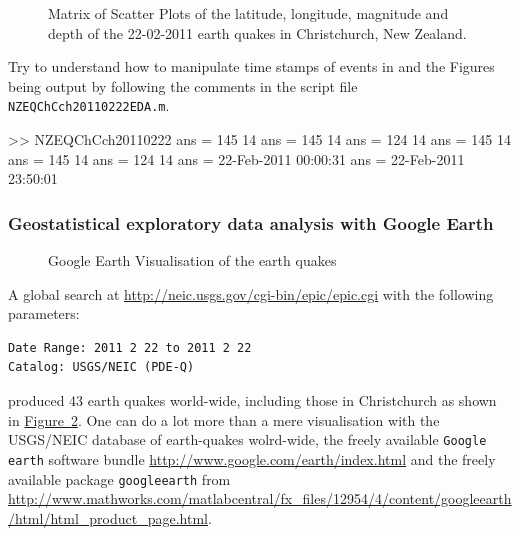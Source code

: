 \begin{figure}[htpb]
\caption{Matrix of Scatter Plots of the latitude, longitude, magnitude and depth of the 22-02-2011 earth quakes in Christchurch, New Zealand.\label{F:NZEQ20110222ChchLtLnMgDpScatterMatrixPlot}}
\centering   {}
\end{figure}


\begin{labwork}\label{LW:NZEQChCch20110222EDA}
Try to understand how to manipulate time stamps of events in \Matlab and the Figures being output by following the comments in the script file {\tt NZEQChCch20110222EDA.m}.
\begin{VrbM}
>> NZEQChCch20110222
ans =   145    14
ans =   145    14
ans =   124    14
ans =   145    14
ans =   145    14
ans =   124    14
ans = 22-Feb-2011 00:00:31
ans = 22-Feb-2011 23:50:01
\end{VrbM}
\end{labwork}

\subsubsection{Geostatistical exploratory data analysis with Google Earth}

\begin{figure}[htpb]
\caption{Google Earth Visualisation of the earth quakes\label{F:NZEQ20110222ChchLtLnMgDpInGoogleEarthViewFromUSGS}}
\centering   {}
\end{figure}

A global search at \href{http://neic.usgs.gov/cgi-bin/epic/epic.cgi}{\url{http://neic.usgs.gov/cgi-bin/epic/epic.cgi}}
with the following parameters:
\begin{verbatim}
Date Range: 2011 2 22 to 2011 2 22 
Catalog: USGS/NEIC (PDE-Q) 
\end{verbatim}
produced 43 earth quakes world-wide, including those in Christchurch as shown in \hyperref[F:NZEQ20110222ChchLtLnMgDpInGoogleEarthViewFromUSGS]{Figure~\ref*{F:NZEQ20110222ChchLtLnMgDpInGoogleEarthViewFromUSGS}}.  One can do a lot more than a mere visualisation with the USGS/NEIC  database of earth-quakes wolrd-wide, the freely available {\tt Google earth} software bundle \href{http://www.google.com/earth/index.html}{\url{http://www.google.com/earth/index.html}} and the freely available \Matlab package {\tt googleearth} from \href{http://www.mathworks.com/matlabcentral/fx_files/12954/4/content/googleearth/html/html_product_page.html}{\url{http://www.mathworks.com/matlabcentral/fx_files/12954/4/content/googleearth/html/html_product_page.html}}.

